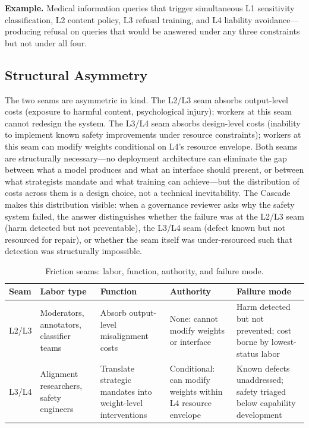 \documentclass[11pt]{article}
\begin{document}
\textbf{Example.} Medical information queries that trigger simultaneous L1 sensitivity classification, L2 content policy, L3 refusal training, and L4 liability avoidance---producing refusal on queries that would be answered under any three constraints but not under all four.

\subsection{Structural Asymmetry}

The two seams are asymmetric in kind. The L2/L3 seam absorbs output-level costs (exposure to harmful content, psychological injury); workers at this seam cannot redesign the system. The L3/L4 seam absorbs design-level costs (inability to implement known safety improvements under resource constraints); workers at this seam can modify weights conditional on L4's resource envelope. Both seams are structurally necessary---no deployment architecture can eliminate the gap between what a model produces and what an interface should present, or between what strategists mandate and what training can achieve---but the distribution of costs across them is a design choice, not a technical inevitability. The Cascade makes this distribution visible: when a governance reviewer asks why the safety system failed, the answer distinguishes whether the failure was at the L2/L3 seam (harm detected but not preventable), the L3/L4 seam (defect known but not resourced for repair), or whether the seam itself was under-resourced such that detection was structurally impossible.

\begin{table}[!htbp]
\centering
\small
\caption{Friction seams: labor, function, authority, and failure mode.}
\label{tab:seams}
{\setlength{\tabcolsep}{4pt}
\begin{tabularx}{\columnwidth}{@{}l l Y Y Y@{}}
\toprule
\textbf{Seam} & \textbf{Labor type} & \textbf{Function} & \textbf{Authority} & \textbf{Failure mode} \\
\midrule
L2/L3 & Moderators, annotators, classifier teams & Absorb output-level misalignment costs & None: cannot modify weights or interface & Harm detected but not prevented; cost borne by lowest-status labor \\
L3/L4 & Alignment researchers, safety engineers & Translate strategic mandates into weight-level interventions & Conditional: can modify weights within L4 resource envelope & Known defects unaddressed; safety triaged below capability development \\
\bottomrule
\end{tabularx}}
\end{table}
\end{document}
